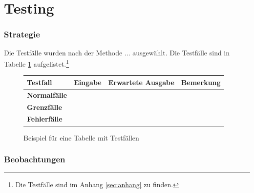 \section{Testing}
\label{sec:testing}


\subsubsection{Strategie}
\label{sssec:strategie}

Die Testfälle wurden nach der Methode $\ldots$ ausgewählt.
Die Testfälle sind in Tabelle \ref{tab:example_testcases} aufgelistet.\footnote{Die Testfälle sind im Anhang \ref{sec:anhang} zu finden.}

\begin{figure}[H]
    \centering
    \begin{tabular}{|l|l|l|l|}
        \hline
        \textbf{Testfall}    & \textbf{Eingabe} & \textbf{Erwartete Ausgabe} & \textbf{Bemerkung} \\
        \hline
        \hline
        \textbf{Normalfälle} &                  &                            &                    \\
        \hline
        \hline
        \textbf{Grenzfälle}  &                  &                            &                    \\
        \hline
        \hline
        \textbf{Fehlerfälle} &                  &                            &                    \\
        \hline
    \end{tabular}
    \caption{Beispiel für eine Tabelle mit Testfällen}
    \label{tab:example_testcases}
\end{figure}

\subsubsection{Beobachtungen}
\label{sssec:beobachtungen}

